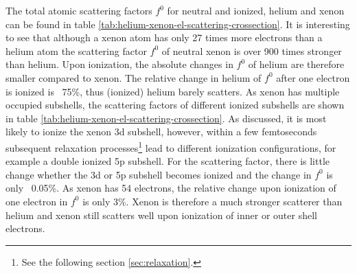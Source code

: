 The total atomic scattering factors $f^{0}$ for neutral and ionized, helium and xenon can be found in table \ref{tab:helium-xenon-el-scattering-crossection}. It is interesting to see that although a xenon atom has only 27 times more electrons than a helium atom the scattering factor $f^{0}$ of neutral xenon is over 900 times stronger than helium. Upon ionization, the absolute changes in $f^{0}$ of helium are therefore smaller compared to xenon. The relative change in helium of $f^{0}$ after one electron is ionized is ~75\%, thus (ionized) helium barely scatters. As xenon has multiple occupied subshells, the scattering factors of different ionized subshells are shown in table \ref{tab:helium-xenon-el-scattering-crossection}. As discussed, it is most likely to ionize the xenon 3d subshell, however, within a few femtoseconds subsequent relaxation processes\footnote{See the following section \ref{sec:relaxation}.} lead to different ionization configurations, for example a double ionized 5p subshell. For the scattering factor, there is little change whether the 3d or 5p subshell becomes ionized and the change in $f^{0}$ is only ~0.05\%. As xenon has 54 electrons, the relative change upon ionization of one electron in $f^{0}$ is only 3\%. Xenon is therefore a much stronger scatterer than helium and xenon still scatters well upon ionization of inner or outer shell electrons.  
